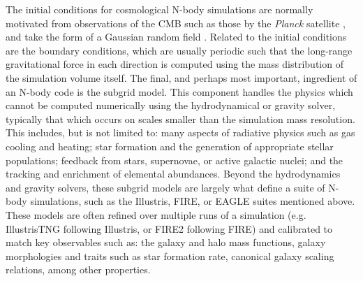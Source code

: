The initial conditions for cosmological N-body simulations are normally motivated from observations of the CMB such as those by the \textit{Planck} satellite \parencite[][]{planck15}, and take the form of a Gaussian random field \parencite[e.g.][]{efstathiou85}. Related to the initial conditions are the boundary conditions, which are usually periodic such that the long-range gravitational force in each direction is computed using the mass distribution of the simulation volume itself. The final, and perhaps most important, ingredient of an N-body code is the subgrid model. This component handles the physics which cannot be computed numerically using the hydrodynamical or gravity solver, typically that which occurs on scales smaller than the simulation mass resolution. This includes, but is not limited to: many aspects of radiative physics such as gas cooling and heating; star formation and the generation of appropriate stellar populations; feedback from stars, supernovae, or active galactic nuclei; and the tracking and enrichment of elemental abundances. Beyond the hydrodynamics and gravity solvers, these subgrid models are largely what define a suite of N-body simulations, such as the Illustris, FIRE, or EAGLE suites mentioned above. These models are often refined over multiple runs of a simulation (e.g. IllustrisTNG following Illustris, or FIRE2 following FIRE) and calibrated to match key observables such as: the galaxy and halo mass functions, galaxy morphologies and traits such as star formation rate, canonical galaxy scaling relations, among other properties.

